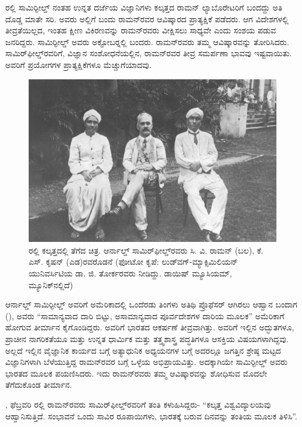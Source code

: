 
ರಲ್ಲಿ ಸಾಮಿರ್‍ಫೀಲ್ಡ್ ನಂತಹ ಉನ್ನತ ದರ್ಜೆಯ ವಿಜ್ಞಾನಿಗಳು ಕಲ್ಕತ್ತದ ರಾಮನ್ ಲ್ಯಾಬೊರೇಟರಿಗೆ ಬಂದದ್ದು ಅತಿ ದೊಡ್ಡ ಮಾತೇ ಸರಿ. ಅವರು ಅಲ್ಲಿಗೆ ಬಂದು ರಾಮನ್‍ರವರ ಆವಿಷ್ಕಾರದ ಪ್ರಾತ್ಯಕ್ಷಿಕೆ ಪಡೆದರು. ಆಗ ವಿದೇಶಗಳಲ್ಲಿ ತೀವ್ರತೆಯಿಲ್ಲದ, ಇಂತಹ ಕ್ಷೀಣ ವಿಕಿರಣವನ್ನು ರಾಮನ್‍ರವರು ವೀಕ್ಷಿಸಲು ಸಾಧ್ಯವೇ ಎಂದು ಸಂಶಯ ಪಡುವ ಜನರಿದ್ದರು. ಸಾಮಿರ್‍ಫೀಲ್ಡ್ ಅವರು  ಅಕ್ಟೋಬರ್‍ನಲ್ಲಿ ಬಂದರು. ರಾಮನ್‍ರವರು ತಮ್ಮ ಆವಿಷ್ಕಾರವನ್ನು ತೋರಿಸಿದರು. ಸಾಮಿರ್‌ಫೀಲ್ಡ್‌ರವರಿಗೆ, ವಿಜ್ಞಾನ ಸಂಶೋಧನೆಯಲ್ಲಿನ, ರಾಮನ್‍ರವರ ತೀವ್ರ ಸಮರ್ಪಣಾ ಭಾವವು ಇಷ್ಟವಾಯಿತು. ಅವರಿಗೆ ಪ್ರಯೋಗಗಳ ಪ್ರಾತ್ಯಕ್ಷಿಕೆಗಳೂ ಮೆಚ್ಚುಗೆಯಾದವು.

\begin{figure}
\includegraphics{"images/3.jpg"}
\caption{ರಲ್ಲಿ ಕಲ್ಕತ್ತದಲ್ಲಿ ತೆಗೆದ ಚಿತ್ರ. ಆರ್ನಾಲ್ಡ್ ಸಾಮಿರ್‌ಫೀಲ್ಡ್‌ರವರು ಸಿ. ವಿ. ರಾಮನ್ (ಬಲ), ಕೆ. ಎಸ್. ಕೃಷನ್ (ಎಡ)ರವರೊಡನೆ (ಫೋಟೋ ಕೃಪೆ: ಲುಡ್‍ವಗ್-ಮ್ಯಾಕ್ಸಿಮಿಲಿಯನ್ ಯುನಿವರ್ಸಿಟಿಯ ಡಾ. ಜಿ. ತೋರ್ಕರವರು ನೀಡಿದ್ದು. ಡಾಯಿಷ್ ಮ್ಯೂಸಿಯಮ್, ಮ್ಯೂನಿಕ್‍ನಲ್ಲಿದೆ)}
\end{figure}

ಆರ್ನಾಲ್ಡ್ ಸಾಮಿರ್‍ಫೀಲ್ಡ್ ಅವರಿಗೆ ಅಮೆರಿಕಾದಲ್ಲಿ ಒಂದೆರಡು ತಿಂಗಳು ಅತಿಥಿ ಪ್ರೊಫೆಸರ್ ಆಗಿರಲು ಆಹ್ವಾನ ಬಂದಾಗ (), ಅವರು “ಸಾಮಾನ್ಯವಾದ ದಾರಿ ಬಿಟ್ಟು, ಅಸಾಮಾನ್ಯವಾದ ಪೂರ್ವದೇಶಗಳ ದಾರಿಯ ಮೂಲಕ” ಅಮೆರಿಕಾಗೆ ಹೋಗುವ ತೀರ್ಮಾನ ಕೈಗೊಂಡಿದ್ದರು. ಅವರಿಗೆ ಭಾರತದ ಆಕರ್ಷಣೆ ತೀವ್ರವಾಗಿತ್ತು. ಅವರಿಗೆ ಇಲ್ಲಿನ ಅದ್ಭುತಗಳೂ, ಪ್ರಾಚೀನ ನಾಗರಿಕತೆಯೂ ಮತ್ತು ಉನ್ನತ ಧಾರ್ಮಿಕ ಮತ್ತು ತತ್ತ್ವಶಾಸ್ತ್ರ ಪದ್ಧತಿಗಳೂ ಆಸಕ್ತಿಯ ವಿಷಯಗಳಾಗಿದ್ದವು. ಅಲ್ಲದೆ ಇಲ್ಲಿನ ವೈಜ್ಞಾನಿಕ ಕಾರ್ಯದ ಬಗ್ಗೆ ಅತ್ಯಾಧುನಿಕ ಅಧ್ಯಯನಗಳ ಬಗ್ಗೆ ಅದರಲ್ಲೂ ಜಗತ್ತಿನ ಶ್ರೇಷ್ಠ ಮಟ್ಟದ ವಿಜ್ಞಾನಿಗಳಾಗಿ ಬೆಳೆಯುತ್ತಿದ್ದ ರಾಮನ್‍ರವರ ಬಗ್ಗೆ ಒಳ್ಳೆಯ ಅಭಿಪ್ರಾಯವಿತ್ತು. ಅದಕ್ಕಾಗಿಯೇ ಸಾಮಿರ್‍ಫೀಲ್ಡ್ ಅವರು ಭಾರತದ ಮೂಲಕ ಪಯಣಿಸಿದರು. ಇದು ರಾಮನ್‍ರವರು ತಮ್ಮ ಆವಿಷ್ಕಾರವನ್ನು ಶೋಧಿಸುವ ಮೊದಲೇ ತೆಗೆದುಕೊಂಡ ತೀರ್ಮಾನ.

, ಫೆಬ್ರವರಿ ರಲ್ಲಿ ರಾಮನ್‍ರವರು ಸಾಮಿರ್‌ಫೀಲ್ಡ್‌ರವರಿಗೆ ತಂತಿ ಕಳುಹಿಸಿದ್ದರು- “ಕಲ್ಕತ್ತ ವಿಶ್ವವಿದ್ಯಾಲಯವು ಆಹ್ವಾನಿಸುತ್ತಿದೆ. ಸಂಭಾವನೆ ಒಂದು ಸಾವಿರ ರೂಪಾಯಿಗಳು, ಭಾರತಕ್ಕೆ ಬರುವ ದಿನವನ್ನು ತಂತಿಯ ಮೂಲಕ ತಿಳಿಸಿ”.


